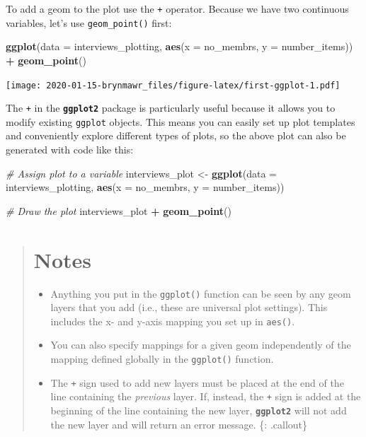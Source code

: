 \documentclass[]{book}
\newenvironment{Shaded}{\begin{snugshade}}{\end{snugshade}}
\newcommand{\KeywordTok}[1]{\textcolor[rgb]{0.13,0.29,0.53}{\textbf{#1}}}
\newcommand{\DataTypeTok}[1]{\textcolor[rgb]{0.13,0.29,0.53}{#1}}
\newcommand{\StringTok}[1]{\textcolor[rgb]{0.31,0.60,0.02}{#1}}
\newcommand{\CommentTok}[1]{\textcolor[rgb]{0.56,0.35,0.01}{\textit{#1}}}
\newcommand{\OperatorTok}[1]{\textcolor[rgb]{0.81,0.36,0.00}{\textbf{#1}}}
\newcommand{\NormalTok}[1]{#1}
\providecommand{\tightlist}{%
  \setlength{\itemsep}{0pt}\setlength{\parskip}{0pt}}
\begin{document}
To add a geom to the plot use the \texttt{+} operator. Because we have
two continuous variables, let's use \texttt{geom\_point()} first:

\begin{Shaded}
\begin{Highlighting}[]
\KeywordTok{ggplot}\NormalTok{(}\DataTypeTok{data =}\NormalTok{ interviews_plotting, }\KeywordTok{aes}\NormalTok{(}\DataTypeTok{x =}\NormalTok{ no_membrs, }\DataTypeTok{y =}\NormalTok{ number_items)) }\OperatorTok{+}
\StringTok{    }\KeywordTok{geom_point}\NormalTok{()}
\end{Highlighting}
\end{Shaded}

\texttt{[image: 2020-01-15-brynmawr\_files/figure-latex/first-ggplot-1.pdf]}

The \texttt{+} in the \textbf{\texttt{ggplot2}} package is particularly
useful because it allows you to modify existing \texttt{ggplot} objects.
This means you can easily set up plot templates and conveniently explore
different types of plots, so the above plot can also be generated with
code like this:

\begin{Shaded}
\begin{Highlighting}[]
\CommentTok{# Assign plot to a variable}
\NormalTok{interviews_plot <-}\StringTok{ }\KeywordTok{ggplot}\NormalTok{(}\DataTypeTok{data =}\NormalTok{ interviews_plotting, }\KeywordTok{aes}\NormalTok{(}\DataTypeTok{x =}\NormalTok{ no_membrs, }\DataTypeTok{y =}\NormalTok{ number_items))}

\CommentTok{# Draw the plot}
\NormalTok{interviews_plot }\OperatorTok{+}
\StringTok{    }\KeywordTok{geom_point}\NormalTok{()}
\end{Highlighting}
\end{Shaded}

\begin{quote}
\section{Notes}\label{notes}

\begin{itemize}
\tightlist
\item
  Anything you put in the \texttt{ggplot()} function can be seen by any
  geom layers that you add (i.e., these are universal plot settings).
  This includes the x- and y-axis mapping you set up in \texttt{aes()}.
\item
  You can also specify mappings for a given geom independently of the
  mapping defined globally in the \texttt{ggplot()} function.
\item
  The \texttt{+} sign used to add new layers must be placed at the end
  of the line containing the \emph{previous} layer. If, instead, the
  \texttt{+} sign is added at the beginning of the line containing the
  new layer, \textbf{\texttt{ggplot2}} will not add the new layer and
  will return an error message. \{: .callout\}
\end{itemize}
\end{quote}
\end{document}
